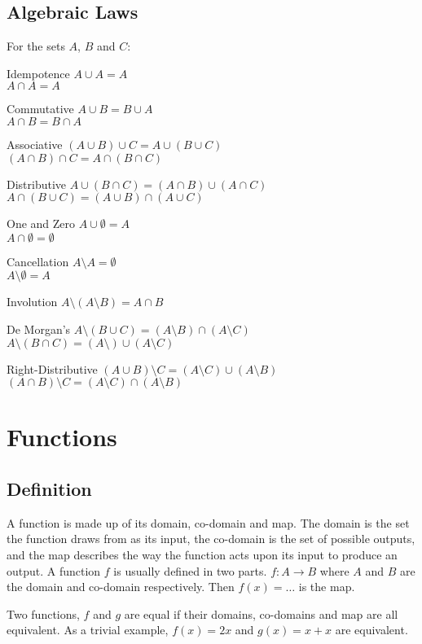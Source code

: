\documentclass[10pt]{article}
\begin{document}
\subsection{Algebraic Laws}
For the sets $A$, $B$ and $C$:
\begin{description*}
\item[Idempotence]
$A\cup A=A$\\$A\cap A=A$
\item[Commutative]
$A\cup B=B\cup A$\\$A\cap B=B\cap A$
\item[Associative]
$(A\cup B)\cup C=A\cup(B\cup C)$\\$(A\cap B)\cap C=A\cap(B\cap C)$
\item[Distributive]
$A\cup(B\cap C)=(A\cap B)\cup(A\cap C)$\\$A\cap(B\cup C)=(A\cup B)\cap(A\cup C)$
\item[One and Zero]
$A\cup \emptyset=A$\\$A\cap\emptyset=\emptyset$
\item[Cancellation]
$A\setminus A=\emptyset$\\$A\setminus \emptyset=A$
\item[Involution]
$A\setminus(A\setminus B)=A\cap B$
\item[De Morgan's]
$A\setminus(B\cup C)=(A\setminus B)\cap(A\setminus C)$\\$A\setminus(B\cap C)=(A\setminus)\cup(A\setminus C)$
\item[Right-Distributive]
$(A\cup B)\setminus C=(A\setminus C)\cup(A\setminus B)$\\$(A\cap B)\setminus C=(A\setminus C)\cap(A\setminus B)$
\end{description*}
\section{Functions}
\subsection{Definition}
A function is made up of its domain, co-domain and map.  The domain is the set the function draws from as its input, the co-domain is the set of possible outputs, and the map describes the way the function acts upon its input to produce an output.  A function $f$ is usually defined in two parts. $f:A\to B$ where $A$ and $B$ are the domain and co-domain respectively.  Then $f(x)=\ldots$ is the map.

Two functions, $f$ and $g$ are equal if their domains, co-domains and map are all equivalent.  As a trivial example, $f(x)=2x$ and $g(x)=x+x$ are equivalent.
\end{document}
